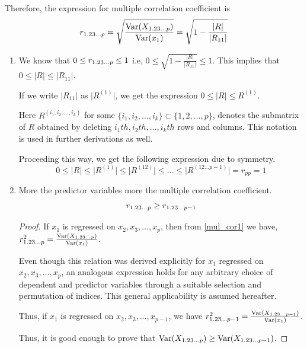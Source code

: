 \documentclass[10pt]{article}
\begin{document}
Therefore, the expression for multiple correlation coefficient is
\begin{equation}
	r_{1.23\dots p} = \sqrt{\frac{\operatorname{Var}(X_{1.23\dots p})}{\operatorname{Var}(x_{1})}} = \sqrt{1 - \frac{\lvert R \rvert }{\lvert R_{11} \rvert }}
\end{equation}

\begin{enumerate}[1., start = 4]
\item We know that \( 0 \leq r_{1.23\dots p} \leq 1 \) i.e, \( 0 \leq \sqrt{1 - \frac{\lvert R \rvert }{\lvert R_{11} \rvert }} \leq 1 \). This implies that \( 0 \leq \lvert R \rvert \leq \lvert R_{11} \rvert \).

	If we write \( \lvert R_{11} \rvert  \) as \( \lvert R^{(1)} \rvert\), we get the expression \( 0 \leq \lvert R \rvert \leq R^{(1)} \).

	Here \( R^{(i_{1}, i_{2}, \dots, i_{k})}\) for some \( \{i_{1}, i_{2}, \dots, i_{k} \} \subset \{1, 2, \dots, p\} \), denotes the submatrix of \( R \) obtained by deleting \( i_{1}th, i_{2}th, \dots, i_{k}th \) rows and columns. This notation is used in further derivations as well.

 Proceeding this way, we get the following expression due to symmetry.
 \[ 0 \leq \lvert R \rvert \leq \lvert R^{(1)} \rvert \leq \lvert R^{(12)} \rvert \leq \dots \leq \lvert R^{(12\dots p-1)} \rvert = r_{pp} = 1\] 

 \item More the predictor variables more the multiple correlation coefficient. \begin{equation}
 	r_{1.23\dots p} \geq r_{1.23\dots p-1}
 \end{equation}
 \begin{proof}
	 If \( x_{1} \) is regressed on \( x_{2}, x_{3}, \dots, x_{p} \), then from \eqref{mul_cor1} we have, \( r_{1.23\dots p}^{2} = \frac{\operatorname{Var}(X_{1.23\dots p})}{\operatorname{Var}(x_{1})} \).

	 Even though this relation was derived explicitly for $x_1$ regressed on $x_2, x_3, \dots, x_p$, an analogous expression holds for any arbitrary choice of dependent and predictor variables through a suitable selection and permutation of indices. This general applicability is assumed hereafter.
	 
	 Thus, if \( x_{1} \) is regressed on \( x_{2}, x_{3}, \dots, x_{p-1} \), we have \( r_{1.23\dots p-1}^{2} = \frac{\operatorname{Var}(X_{1.23\dots p-1})}{\operatorname{Var}(x_{1})} \).
	 
	 Thus, it is good enough to prove that \( \operatorname{Var}(X_{1.23\dots p}) \geq \operatorname{Var}(X_{1.23\dots p-1}) \).
	 

\end{proof}
\end{enumerate}
\end{document}
